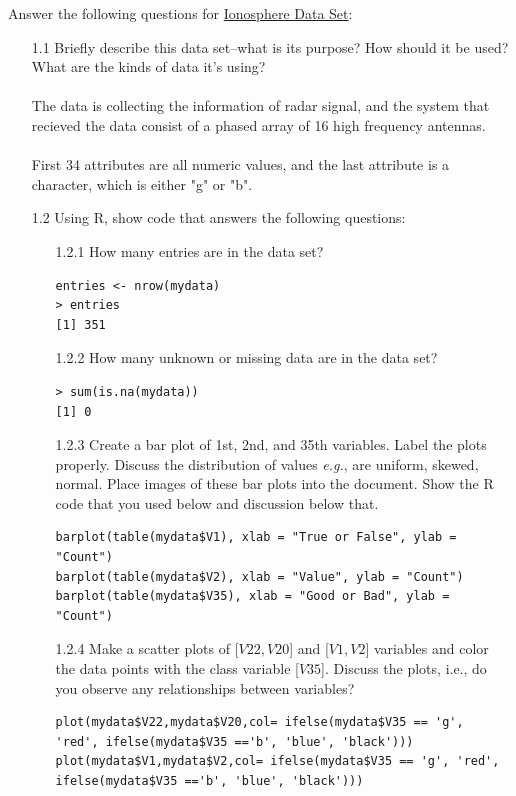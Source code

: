 \documentclass{article}
\begin{document}
 Answer the following questions for  \href{https://archive.ics.uci.edu/ml/datasets/ionosphere}{
Ionosphere Data Set}:
\begin{enumerate}
\item[1.1] Briefly describe this data set--what is its purpose?  How should it be used? What are the kinds of data it's using?
\paragraph{}
The data is collecting the information of radar signal, and the system that recieved the data consist of a phased array of 16 high frequency antennas. \\
\\
First 34 attributes are all numeric values, and the last attribute is a character, which is either "g" or "b".
\item[1.2]  Using R, show code that answers the following questions:
\begin{enumerate}
\item[1.2.1]   How many entries are in the data set?
\begin{lstlisting}
entries <- nrow(mydata)
> entries
[1] 351
\end{lstlisting}
\item[1.2.2]   How many unknown or missing data are in the data set? 
\begin{lstlisting}
> sum(is.na(mydata))
[1] 0
\end{lstlisting}
\item[1.2.3] Create a bar plot  of 1st, 2nd, and 35th variables. Label the plots properly. Discuss the distribution of values \textit{e.g.}, are uniform, skewed, normal.  Place images of these bar plots into the document.   Show the R code that you used below and discussion below that. 
\begin{lstlisting}
barplot(table(mydata$V1), xlab = "True or False", ylab = "Count")
barplot(table(mydata$V2), xlab = "Value", ylab = "Count")
barplot(table(mydata$V35), xlab = "Good or Bad", ylab = "Count")
\end{lstlisting}
\item[1.2.4]  Make a scatter plots of [$V22, V20$] and [$V1,V2$] variables and color the data points with the class variable [$V35$]. Discuss the plots, i.e., do you observe any relationships between variables?
\begin{lstlisting}
plot(mydata$V22,mydata$V20,col= ifelse(mydata$V35 == 'g', 'red', ifelse(mydata$V35 =='b', 'blue', 'black')))
plot(mydata$V1,mydata$V2,col= ifelse(mydata$V35 == 'g', 'red', ifelse(mydata$V35 =='b', 'blue', 'black')))

\end{lstlisting}
\end{enumerate}
\end{enumerate}
\end{document}

